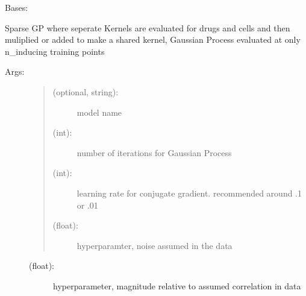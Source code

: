 \documentclass[letterpaper,10pt,english,openany,oneside]{sphinxmanual}
\begin{document}

\begin{fulllineitems}
\label{\detokenize{gp:methods.regressor.SparseGPCompositeKernel.SparseGPCompositeKernelRegression}}
Bases: 

Sparse GP where seperate Kernels are evaluated for drugs and cells and then muliplied or added to make a shared kernel, Gaussian Process evaluated at only n\_inducing training points
\begin{description}
\item[{Args:}] \leavevmode\begin{quote}
\begin{description}
\item[{ (optional, string):}] \leavevmode
model name

\item[{ (int):}] \leavevmode
number of iterations for Gaussian Process

\item[{ (int):}] \leavevmode
learning rate for conjugate gradient. recommended around .1 or .01

\item[{ (float):}] \leavevmode
hyperparamter, noise assumed in the data

\end{description}
\end{quote}
\begin{description}
\item[{ (float):}] \leavevmode
hyperparameter, magnitude relative to assumed correlation in  data


\end{description}
\end{description}
\end{fulllineitems}
\end{document}
